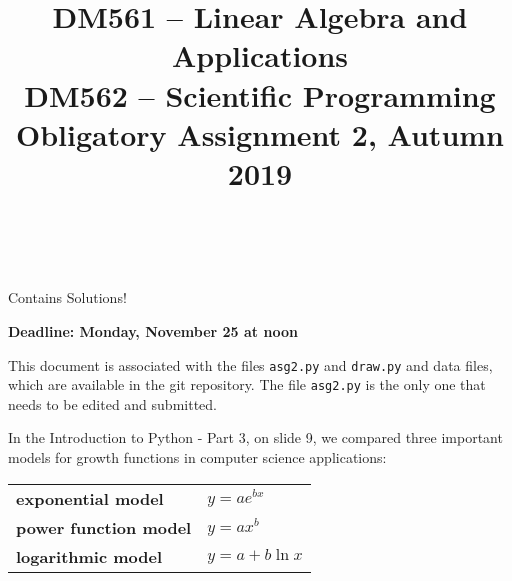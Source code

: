 \documentclass[a4paper,10pt]{article}
\title{%
\begin{flushleft}
  DM561 -- Linear Algebra and Applications\\
  DM562 -- Scientific Programming\\[0.3cm]
{\Large Obligatory Assignment 2, Autumn 2019} %
\\
\hrulefill
\\[-1.8cm]
\end{flushleft}
}
\author{}
\date{}
\begin{document}
\maketitle



\begin{solution}
Contains Solutions!
\end{solution}



\begin{center}
  {\bf Deadline: Monday, November 25 at noon}
\end{center}



This document is associated with the files \lstinline{asg2.py} and
\lstinline{draw.py} and data files, which are available in the git
repository. The file \lstinline{asg2.py} is the only one that needs to be
edited and submitted.

\bigskip

%
%
%
%
%
%
%
%

In the Introduction to Python - Part 3, on slide 9, we compared three
important models for growth functions in computer science applications:

\begin{table}[h]
  \begin{tabular}{ll}
    \textbf{exponential model}&$y=ae^{bx}$\\
    \textbf{power function model}&$y=ax^b$\\
    \textbf{logarithmic model}&$y=a+b\ln x$
  \end{tabular}
\end{table}
\end{document}
